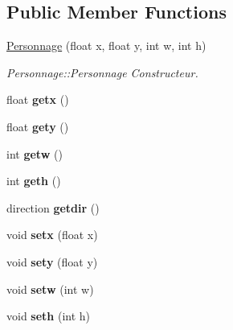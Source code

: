 \subsection*{Public Member Functions}
\begin{DoxyCompactItemize}
\item 
\hyperlink{class_personnage_ab4bac03083b369311944718bbad4e7dc}{Personnage} (float x, float y, int w, int h)
\begin{DoxyCompactList}\small\item\em Personnage\+::\+Personnage Constructeur. \end{DoxyCompactList}\item 
\hypertarget{class_personnage_a27cc1b2cd8f95546b646d5693157b3c6}{}float {\bfseries getx} ()\label{class_personnage_a27cc1b2cd8f95546b646d5693157b3c6}

\item 
\hypertarget{class_personnage_acaa6215bf06086ebf688e2b2e2e676f5}{}float {\bfseries gety} ()\label{class_personnage_acaa6215bf06086ebf688e2b2e2e676f5}

\item 
\hypertarget{class_personnage_aac0bd2c4c3bda5d26af8060f348e2b38}{}int {\bfseries getw} ()\label{class_personnage_aac0bd2c4c3bda5d26af8060f348e2b38}

\item 
\hypertarget{class_personnage_a29d38db07c8e6406caeea2fa832374af}{}int {\bfseries geth} ()\label{class_personnage_a29d38db07c8e6406caeea2fa832374af}

\item 
\hypertarget{class_personnage_afff305624380f7fea61ea34d25a23db0}{}direction {\bfseries getdir} ()\label{class_personnage_afff305624380f7fea61ea34d25a23db0}

\item 
\hypertarget{class_personnage_a017efb88daf72424a7b1e23431bcf60f}{}void {\bfseries setx} (float x)\label{class_personnage_a017efb88daf72424a7b1e23431bcf60f}

\item 
\hypertarget{class_personnage_ac91b7c71a7f25e3e1696469e7012383d}{}void {\bfseries sety} (float y)\label{class_personnage_ac91b7c71a7f25e3e1696469e7012383d}

\item 
\hypertarget{class_personnage_adb1c763969fee6521f870a21b2593387}{}void {\bfseries setw} (int w)\label{class_personnage_adb1c763969fee6521f870a21b2593387}

\item 
\hypertarget{class_personnage_a27cec3441dcb29cdd98aceb107e0a6d4}{}void {\bfseries seth} (int h)\label{class_personnage_a27cec3441dcb29cdd98aceb107e0a6d4}


\end{DoxyCompactItemize}
